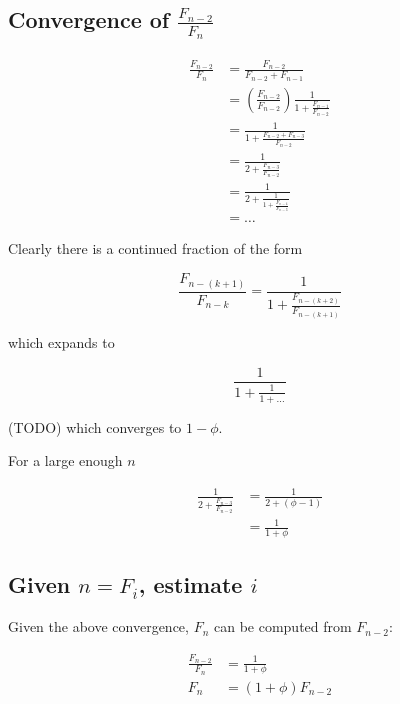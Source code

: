 \documentclass[12pt, letterpaper]{article}
\begin{document}
\subsection*{Convergence of $\frac{F_{n-2}}{F_n}$}
\begin{align*}
    \frac{F_{n-2}}{F_n} &= \frac{F_{n-2}}{F_{n-2}+F_{n-1}}\\
                        &= \left(\frac{F_{n-2}}{F_{n-2}}\right)\frac{1}{1+\frac{F_{n-1}}{F_{n-2}}}\\
                        &= \frac{1}{1+\frac{F_{n-2}+F_{n-3}}{F_{n-2}}}\\
                        &= \frac{1}{2+\frac{F_{n-3}}{F_{n-2}}}\\
                        &= \frac{1}{2+\frac{1}{1+\frac{F_{n-4}}{F_{n-3}}}}\\
                        &= \ldots
\end{align*}

Clearly there is a continued fraction of the form

\begin{equation*}
    \frac{F_{n-(k+1)}}{F_{n-k}} = \frac{1}{1+\frac{F_{n-(k+2)}}{F_{n-(k+1)}}}
\end{equation*}

which expands to

\begin{equation*}
    \frac{1}{1+\frac{1}{1+\ldots}}
\end{equation*}

(TODO) which converges to $1-\phi$.

For a large enough $n$

\begin{align*}
    \frac{1}{2+\frac{F_{n-3}}{F_{n-2}}} &= \frac{1}{2+(\phi-1)}\\
                                        &= \frac{1}{1+\phi}
\end{align*}

\newpage

\subsection*{Given $n=F_i$, estimate $i$}

Given the above convergence, $F_n$ can be computed from $F_{n-2}$:

\begin{align*}
    \frac{F_{n-2}}{F_n} &= \frac{1}{1+\phi}\\
    F_n &= \left(1+\phi\right)F_{n-2}
\end{align*}
\end{document}

